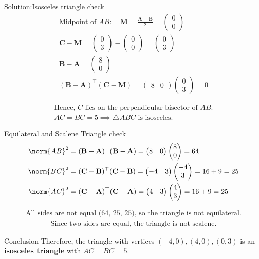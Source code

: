 \documentclass{beamer}
\numberwithin{equation}{section}
\newcommand{\myvec}[1]{\ensuremath{\begin{pmatrix}#1\end{pmatrix}}}
\let\vec\mathbf
\begin{document}
\begin{frame}{Solution:Isosceles triangle check}
    \begin{align}
\text{Midpoint of } AB: \quad \vec{M} = \frac{\vec{A}+\vec{B}}{2} = \myvec{0\\0} \\
\vec{C}-\vec{M} = \myvec{0\\3}-\myvec{0\\0} = \myvec{0\\3} \\
\vec{B}-\vec{A} = \myvec{8\\0} \\
(\vec{B}-\vec{A})^\top (\vec{C}-\vec{M}) = \myvec{8&0}\myvec{0\\3} = 0
\end{align}


\begin{align*}
\text{Hence, } C \text{ lies on the perpendicular bisector of } AB.\\
AC = BC = 5 \implies \triangle ABC \text{ is isosceles.}
\end{align*}

\end{frame}

\begin{frame}{Equilateral and Scalene Triangle check}
    \begin{align}
\norm{AB}^2 &= (\vec{B}-\vec{A})^\top (\vec{B}-\vec{A}) = \myvec{8&0}\myvec{8\\0} = 64 \\
\norm{BC}^2 &= (\vec{C}-\vec{B})^\top (\vec{C}-\vec{B}) = \myvec{-4&3}\myvec{-4\\3} = 16 + 9 = 25 \\
\norm{AC}^2 &= (\vec{C}-\vec{A})^\top (\vec{C}-\vec{A}) = \myvec{4&3}\myvec{4\\3} = 16 + 9 = 25
\end{align}

\begin{align*}
\text{All sides are not equal (64, 25, 25), so the triangle is not equilateral.}
\end{align*}\begin{align*}
\text{Since two sides are equal, the triangle is not scalene.}
\end{align*}
\end{frame}

\begin{frame}{Conclusion}
Therefore, the triangle with vertices $(-4,0), (4,0), (0,3)$ is an \textbf{isosceles triangle} with $AC = BC = 5$.    
\end{frame}
\end{document}
